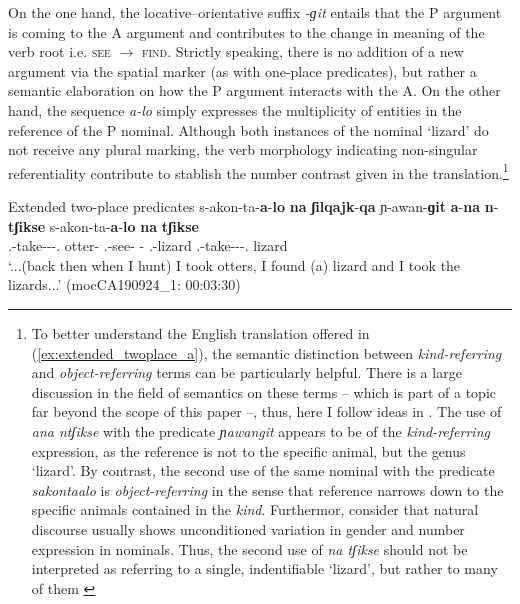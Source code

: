 \documentclass[12pt]{article}
\begin{document}
On the one hand, the locative--orientative suffix \textit{-ɡit} entails that the P argument is coming to the A argument and contributes to the change in meaning of the verb root i.e. \textsc{see} $\rightarrow$ \textsc{find}. Strictly speaking, there  is no addition of a new argument via the spatial marker (as with one-place predicates), but rather a semantic elaboration on how the P argument interacts with the A. On the other hand, the sequence \textit{a-lo} simply expresses the multiplicity of entities in the reference of the P nominal. Although both instances of the nominal `lizard' do not receive any plural marking, the verb morphology indicating non-singular referentiality contribute to stablish the number contrast given in the translation.\footnote{To better understand the English translation offered in (\ref{ex:extended_twoplace_a}), the semantic distinction between \textit{kind-referring} and \textit{object-referring} terms can be particularly helpful. There is a large discussion in the field of semantics on these terms -- which is part of a topic far beyond the scope of this paper --, thus, here I follow ideas in \cite{krifka.etal1995}. The use of \textit{ana ntʃikse} with the predicate \textit{ɲawangit} appears to be of the \textit{kind-referring} expression, as the reference is not to the specific animal, but the genus `lizard'. By contrast, the second use of the same nominal with the predicate \textit{sakontaalo} is \textit{object-referring} in the sense that reference narrows down to the specific animals contained in the \textit{kind}. Furthermor, consider that natural discourse usually shows unconditioned variation in gender and number expression in nominals. Thus, the second use of \textit{na tʃikse} should not be interpreted as referring to a single, indentifiable `lizard', but rather to many of them \citep[see also][]{krifka2025}}  

\begin{exe}
\ex Extended two-place predicates \label{ex:extended_twoplace_a}
\gll s-akon-ta-\textbf{a}-\textbf{lo} \textbf{na} \textbf{ʃilqajk}-\textbf{qa} ɲ-awan-\textbf{ɡit} \textbf{a}-\textbf{na} \textbf{n}-\textbf{tʃikse} s-akon-ta-\textbf{a}-\textbf{lo} \textbf{na} \textbf{tʃikse}  \\
{\First.\II}-take-{\Dur}-{\Arg}-{\Arg.\Pl} {\DetThree} otter-{\Pl} {\First.\III}-see-{\LocThree} {\F}-{\DetThree} {\Indet.\Poss}-lizard {\First.\II}-take-{\Dur}-{\Arg}-{\Arg.\Pl} {\DetThree} lizard\\	
\trans `...(back then when I hunt) I took otters, I found (a) lizard and I took the lizards...'  \trans \hfill(mocCA190924\_1: 00:03:30)
\end{exe}
\end{document}
